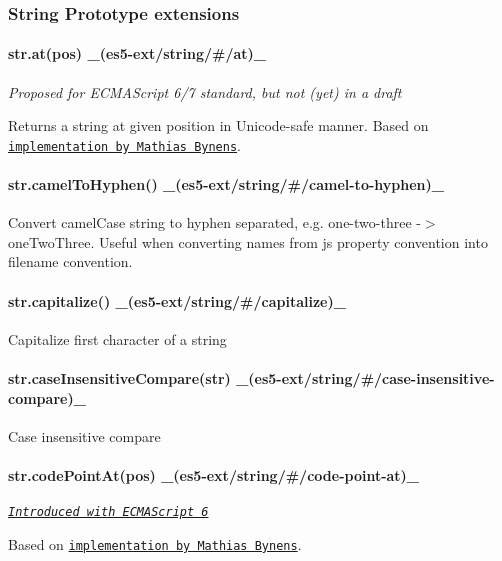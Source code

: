 \subsubsection*{String Prototype extensions}

\paragraph*{str.\+at(pos) \+\_\+(es5-\/ext/string/\#/at)\+\_\+}

{\itshape Proposed for E\+C\+M\+A\+Script 6/7 standard, but not (yet) in a draft}

Returns a string at given position in Unicode-\/safe manner. Based on \href{https://github.com/mathiasbynens/String.prototype.at}{\tt implementation by Mathias Bynens}.

\paragraph*{str.\+camel\+To\+Hyphen() \+\_\+(es5-\/ext/string/\#/camel-\/to-\/hyphen)\+\_\+}

Convert camel\+Case string to hyphen separated, e.\+g. one-\/two-\/three -\/$>$ one\+Two\+Three. Useful when converting names from js property convention into filename convention.

\paragraph*{str.\+capitalize() \+\_\+(es5-\/ext/string/\#/capitalize)\+\_\+}

Capitalize first character of a string

\paragraph*{str.\+case\+Insensitive\+Compare(str) \+\_\+(es5-\/ext/string/\#/case-\/insensitive-\/compare)\+\_\+}

Case insensitive compare

\paragraph*{str.\+code\+Point\+At(pos) \+\_\+(es5-\/ext/string/\#/code-\/point-\/at)\+\_\+}

\href{http://people.mozilla.org/~jorendorff/es6-draft.html#sec-string.prototype.codepointat}{\tt {\itshape Introduced with E\+C\+M\+A\+Script 6}}

Based on \href{https://github.com/mathiasbynens/String.prototype.codePointAt}{\tt implementation by Mathias Bynens}.

